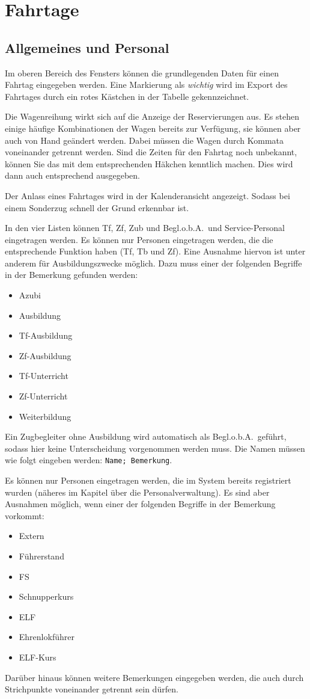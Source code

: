\chapter{Fahrtage}
\section{Allgemeines und Personal}
Im oberen Bereich des Fensters können die grundlegenden Daten für einen Fahrtag eingegeben werden.
Eine Markierung als \emph{wichtig} wird im Export des Fahrtages durch ein rotes Kästchen in der Tabelle gekennzeichnet.

Die Wagenreihung wirkt sich auf die Anzeige der Reservierungen aus.
Es stehen einige häufige Kombinationen der Wagen bereits zur Verfügung, sie können aber auch von Hand geändert werden.
Dabei müssen die Wagen durch Kommata voneinander getrennt werden.
Sind die Zeiten für den Fahrtag noch unbekannt, können Sie das mit dem entsprechenden Häkchen kenntlich machen.
Dies wird dann auch entsprechend ausgegeben.

Der Anlass eines Fahrtages wird in der Kalenderansicht angezeigt.
Sodass bei einem Sonderzug schnell der Grund erkennbar ist.

In den vier Listen können Tf, Zf, Zub und Begl.o.b.A.\ und Service-Personal eingetragen werden.
Es können nur Personen eingetragen werden, die die entsprechende Funktion haben (Tf, Tb und Zf).
Eine Ausnahme hiervon ist unter anderem für Ausbildungszwecke möglich.
Dazu muss einer der folgenden Begriffe in der Bemerkung gefunden werden:
\begin{itemize}
	\item Azubi
	\item Ausbildung
	\item Tf-Ausbildung
	\item Zf-Ausbildung
	\item Tf-Unterricht
	\item Zf-Unterricht
	\item Weiterbildung
\end{itemize}
Ein Zugbegleiter ohne Ausbildung wird automatisch als Begl.o.b.A.\ geführt, sodass hier keine Unterscheidung vorgenommen werden muss.
Die Namen müssen wie folgt eingeben werden: \texttt{Name; Bemerkung}.

Es können nur Personen eingetragen werden, die im System bereits registriert wurden
(näheres im Kapitel über die Personalverwaltung).
Es sind aber Ausnahmen möglich, wenn einer der folgenden Begriffe in der Bemerkung vorkommt:
\begin{itemize}
	\item Extern
	\item Führerstand
	\item FS
	\item Schnupperkurs
	\item ELF
	\item Ehrenlokführer
	\item ELF-Kurs
\end{itemize}
Darüber hinaus können weitere Bemerkungen eingegeben werden, die auch durch Strichpunkte voneinander getrennt sein dürfen.


